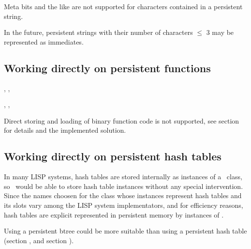 Meta bits and the like are not supported for characters contained in a
persistent string.

In the future, persistent strings with their number of characters
$\leq$ 3 may be represented as immediates.

\subsection[Persistent functions]{Working directly on persistent
  functions}

\begin{NarrowRefList}

  \Allocator {}


  \TypePredicate {}

  \ObjectStore {}

  \ObjectLoad {}

  \SlotReader {}, ,

  \SlotWriter {}, , 

\end{NarrowRefList}
Direct storing and loading of binary function code is not supported,
see section  for details and the implemented
solution.

\subsection[Persistent hash tables]{Working directly on persistent
  hash tables}

In many LISP systems, hash tables are stored internally as instances
of a \ class, so \plob\ would be able to store hash
table instances without any special intervention. Since the names
choosen for the class whose instances represent hash tables and its
slots vary among the LISP system implementators, and for efficiency
reasons, hash tables are explicit represented in persistent memory by
instances of .  
\begin{NarrowRefList}
\ObjectStore {}
\ObjectLoad {}
\end{NarrowRefList}
Using a persistent btree could be more suitable than using a
persistent hash table (section , and
section ).

